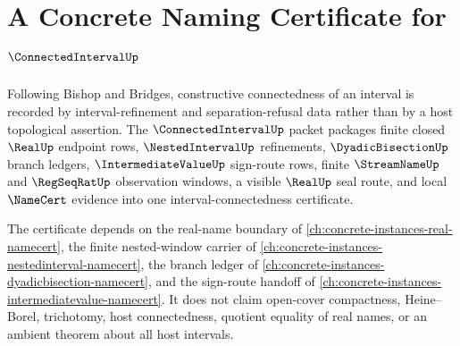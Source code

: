 \chapter{A Concrete Naming Certificate for $\ConnectedIntervalUp$}
\label{ch:concrete-instances-connectedinterval-namecert}

Following Bishop and Bridges, constructive connectedness of an interval is recorded by interval-refinement and separation-refusal data rather than by a host topological assertion. The $\ConnectedIntervalUp$ packet packages finite closed $\RealUp$ endpoint rows, $\NestedIntervalUp$ refinements, $\DyadicBisectionUp$ branch ledgers, $\IntermediateValueUp$ sign-route rows, finite $\StreamNameUp$ and $\RegSeqRatUp$ observation windows, a visible $\RealUp$ seal route, and local $\NameCert$ evidence into one interval-connectedness certificate.

The certificate depends on the real-name boundary of \autoref{ch:concrete-instances-real-namecert}, the finite nested-window carrier of \autoref{ch:concrete-instances-nestedinterval-namecert}, the branch ledger of \autoref{ch:concrete-instances-dyadicbisection-namecert}, and the sign-route handoff of \autoref{ch:concrete-instances-intermediatevalue-namecert}. It does not claim open-cover compactness, Heine--Borel, trichotomy, host connectedness, quotient equality of real names, or an ambient theorem about all host intervals.

